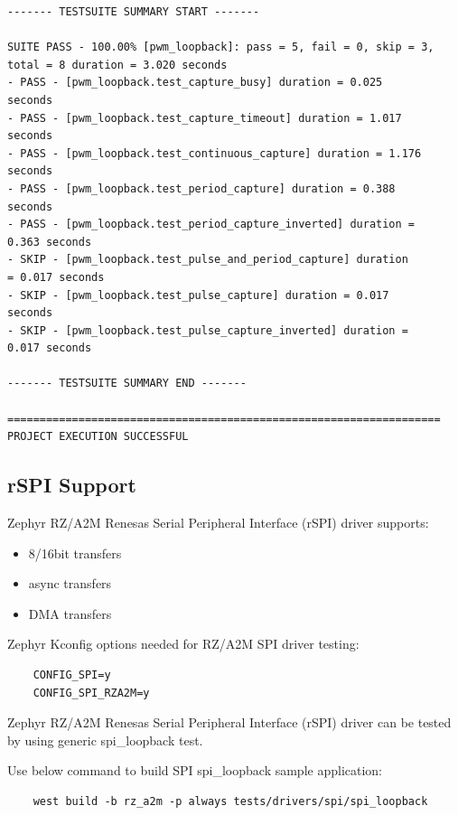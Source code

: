 \documentclass[11pt,a4paper,oneside]{article}
\begin{document}
\begin{lstlisting}
------- TESTSUITE SUMMARY START -------

SUITE PASS - 100.00% [pwm_loopback]: pass = 5, fail = 0, skip = 3,
total = 8 duration = 3.020 seconds
- PASS - [pwm_loopback.test_capture_busy] duration = 0.025
seconds
- PASS - [pwm_loopback.test_capture_timeout] duration = 1.017
seconds
- PASS - [pwm_loopback.test_continuous_capture] duration = 1.176
seconds
- PASS - [pwm_loopback.test_period_capture] duration = 0.388
seconds
- PASS - [pwm_loopback.test_period_capture_inverted] duration =
0.363 seconds
- SKIP - [pwm_loopback.test_pulse_and_period_capture] duration
= 0.017 seconds
- SKIP - [pwm_loopback.test_pulse_capture] duration = 0.017
seconds
- SKIP - [pwm_loopback.test_pulse_capture_inverted] duration =
0.017 seconds

------- TESTSUITE SUMMARY END -------

===================================================================
PROJECT EXECUTION SUCCESSFUL
\end{lstlisting}

\subsection{rSPI Support}\label{rspi-support}

Zephyr RZ/A2M Renesas Serial Peripheral Interface (rSPI) driver supports:
\begin{itemize}
	\item 8/16bit transfers
	\item async transfers
	\item DMA transfers
\end{itemize}

Zephyr Kconfig options needed for RZ/A2M SPI driver testing:

\begin{lstlisting}
	CONFIG_SPI=y
	CONFIG_SPI_RZA2M=y
\end{lstlisting}

Zephyr RZ/A2M Renesas Serial Peripheral Interface (rSPI) driver can be tested by using generic spi\_loopback test.

Use below command to build SPI spi\_loopback sample application:

\begin{lstlisting}
	west build -b rz_a2m -p always tests/drivers/spi/spi_loopback
\end{lstlisting}
\end{document}
